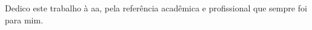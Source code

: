 
\begin{dedicatoria}%

Dedico este trabalho à aa, pela referência acadêmica e profissional que sempre foi para mim.

\end{dedicatoria}
